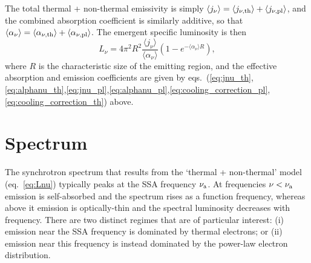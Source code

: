 \documentclass[twocolumn]{aastex63}
\begin{document}
The total thermal + non-thermal emissivity is simply $\langle j_\nu \rangle = \langle j_{\nu,{\rm th}} \rangle + \langle j_{\nu,{\rm pl}} \rangle$, and the combined absorption coefficient is similarly additive, so that $\langle \alpha_\nu \rangle = \langle \alpha_{\nu,{\rm th}} \rangle + \langle \alpha_{\nu,{\rm pl}} \rangle$.
The emergent specific luminosity is then
\begin{equation}
\label{eq:Lnu}
    L_\nu = 4\pi^2 R^2 \frac{\langle j_\nu \rangle}{\langle \alpha_\nu \rangle} \left( 1 - e^{-\langle \alpha_\nu \rangle R} \right) ,
\end{equation}
where $R$ is the characteristic size of the emitting region, and the effective absorption and emission coefficients are given by eqs.~(\ref{eq:jnu_th},\ref{eq:alphanu_th},\ref{eq:jnu_pl},\ref{eq:alphanu_pl},\ref{eq:cooling_correction_pl},\ref{eq:cooling_correction_th}) above.


\section{Spectrum}
\label{sec:SED}

The synchrotron spectrum that results from the `thermal + non-thermal' model (eq.~\ref{eq:Lnu}) typically peaks at the SSA frequency $\nu_{\rm a}$. At frequencies $\nu < \nu_{\rm a}$ emission is self-absorbed and the spectrum rises as a function frequency, whereas above it emission is optically-thin and the spectral luminosity decreases with frequency.
There are two distinct regimes that are of particular interest: (i) emission near the SSA frequency is dominated by thermal electrons; or (ii) emission near this frequency is instead dominated by the power-law electron distribution.
\end{document}
